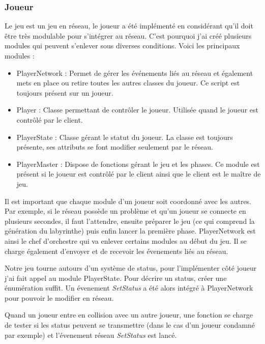 \documentclass{article}
\begin{document}
\subsubsection{Joueur}

Le jeu est un jeu en réseau, le joueur a été implémenté en considérant qu'il doit être très modulable pour s'intégrer au réseau.
C'est pourquoi j'ai créé plusieurs modules qui peuvent s'enlever sous diverses conditions.
Voici les principaux modules :

\begin{itemize}
	\item  PlayerNetwork : Permet de gérer les événements liés au réseau et également
mets en place ou retire toutes les autres classes du joueur. Ce script est
toujours présent sur un joueur.
	\item  Player : Classe permettant de contrôler le joueur. Utilisée quand le joueur
est contrôlé par le client.
	\item  PlayerState : Classe gérant le statut du joueur. La classe est toujours
présente, ses attributs se font modifier seulement par le réseau.
	\item PlayerMaster : Dispose de fonctions gérant le jeu et les phases. Ce module
est présent si le joueur est contrôlé par le client ainsi que le client est le
maître de jeu.
\end{itemize}

Il est important que chaque module d'un joueur soit coordonné avec les autres. Par exemple, si le réseau possède un problème et qu'un joueur se connecte en plusieurs secondes, il faut l'attendre, ensuite préparer le jeu (ce qui comprend la génération du labyrinthe) puis enfin lancer la première phase. PlayerNetwork est ainsi le chef d'orchestre qui va enlever certains modules au début du jeu. Il se charge également d'envoyer et de recevoir les évenements liés au réseau.

Notre jeu tourne autours d'un système de status, pour l'implémenter côté joueur j'ai fait appel au module PlayerState.
Pour décrire un status, créer une énumération suffit. Un évenement \emph{SetStatus} a été alors intégré à PlayerNetwork pour pouvoir le modifier en réseau.

Quand un joueur entre en collision avec un autre joueur, une fonction se charge de tester si les status peuvent se transmettre (dans le cas d'un joueur condamné par exemple) et l'évenement réseau \emph{SetStatus} est lancé.
\end{document}

